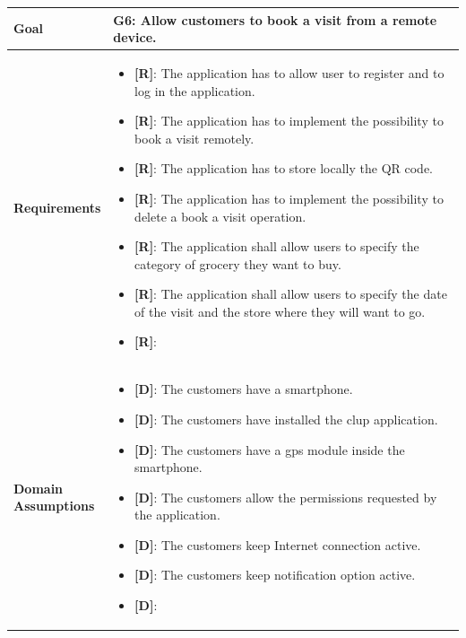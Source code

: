 \begin{table}[H]
\centering
\begin{tabular}{| m{} | m{} |} 
	\hline
	\textbf{Goal} &
		\textbf{G6: Allow customers to book a visit from a remote device.} \\
	\hline
	\textbf{Requirements} &
		\begin{itemize}
			\item {\textbf{[R]}}: The application has to allow user to register and to log in the application.
			\item {\textbf{[R]}}: The application has to implement the possibility to book a visit remotely.
			\item {\textbf{[R]}}: The application has to store locally the QR code.
			\item {\textbf{[R]}}: The application has to implement the possibility to delete a book a visit operation.
			\item {\textbf{[R]}}: The application shall allow users to specify the category of grocery they want to buy.
			\item {\textbf{[R]}}: The application shall allow users to specify the date of the visit and the store where they will want to go.
			\item {\textbf{[R]}}:
		\end{itemize} \\ 
	\hline
	\shortstack[l]{\textbf{Domain} \\ \textbf{Assumptions}} & 
		\begin{itemize}
			\item {\textbf{[D]}}: The customers have a smartphone.
			\item {\textbf{[D]}}: The customers have installed the \gls{clup} application.
			\item {\textbf{[D]}}: The customers have a \gls{gps} module inside the smartphone.
			\item {\textbf{[D]}}: The customers allow the permissions requested by the application.
			\item {\textbf{[D]}}: The customers keep Internet connection active.
			\item {\textbf{[D]}}: The customers keep notification option active.
			\item {\textbf{[D]}}:
		\end{itemize} \\ 
	\hline
\end{tabular}
\end{table}

